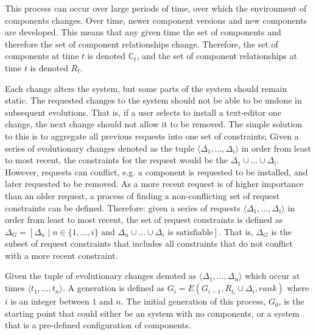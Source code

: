 This process can occur over large periods of time, over which the environment of components changes.
Over time, newer component versions and new components are developed.
This means that any given time the set of components and therefore the set of component relationships change.
Therefore, the set of components at time $t$ is denoted $\mathbb{C}_t$, and the set of component relationships at time $t$ is denoted $R_t$.

Each change alters the system, but some parts of the system should remain static.
The requested changes to the system should not be able to be undone in subsequent evolutions.
That is, if a user selects to install a text-editor one change, the next change should not allow it to be removed.  
The simple solution to this is to aggregate all previous requests into one set of constraints;
Given a series of evolutionary changes denoted as the tuple $\langle \Delta_1, \ldots, \Delta_i \rangle$ in order from least to most recent,
the constraints for the request would be the $\Delta_1 \cup \ldots \cup \Delta_i$.
However, requests can conflict, e.g. a component is requested to be installed, and later requested to be removed.
As a more recent request is of higher importance than an older request, a process of finding a non-conflicting set of request constraints can be defined.
Therefore: given a series of requests $\langle \Delta_1, \ldots, \Delta_i \rangle$ in order from least to most recent,
the set of request constraints is defined as $\Delta_G = [\Delta_n \mid n \in \{1, \ldots , i\} \mbox{ and } \Delta_n \cup \ldots \cup \Delta_i \mbox{ is satisfiable}]$.
That is, $\Delta_G$ is the subset of request constraints that includes all constraints that do not conflict with a more recent constraint.

Given the tuple of evolutionary changes denoted as $\langle \Delta_1, \ldots, \Delta_n \rangle$
which occur at times  $\langle t_1, \ldots, t_n \rangle$.
A generation is defined as $G_i = E(G_{i-1},R_{t_i} \cup \Delta_i,rank)$ where $i$ is an integer between $1$ and $n$.
The initial generation of this process, $G_0$, is the starting point that could either be an system with no components, or a system that is a pre-defined configuration of components.

